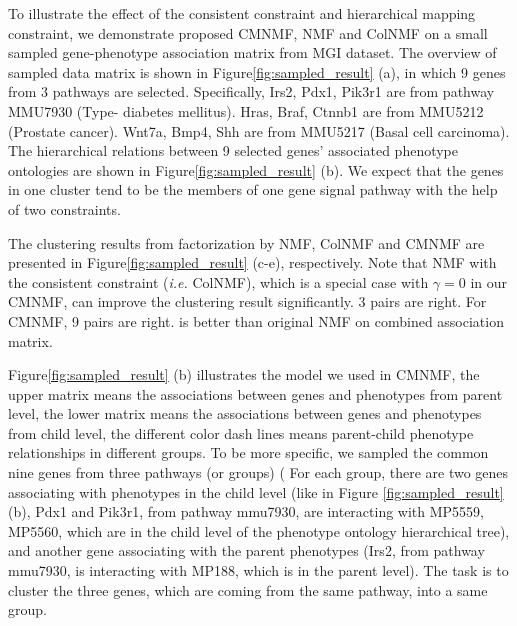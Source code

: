 \documentclass{bmcart}
\begin{document}
To illustrate the effect of the consistent constraint and hierarchical mapping constraint, we demonstrate proposed CMNMF, NMF and ColNMF on a small sampled gene-phenotype association matrix from MGI dataset. The overview of sampled data matrix is shown in Figure\ref{fig:sampled_result} (a), in which 9 genes from 3 pathways are selected. Specifically, Irs2, Pdx1, Pik3r1 are from pathway MMU7930 (Type-\uppercase\expandafter{} diabetes mellitus). Hras, Braf, Ctnnb1 are from MMU5212 (Prostate cancer). Wnt7a, Bmp4, Shh are from MMU5217 (Basal cell carcinoma). The hierarchical relations between 9 selected genes' associated phenotype ontologies are shown in Figure\ref{fig:sampled_result} (b). We expect that the genes in one cluster tend to be the members of one gene signal pathway with the help of two constraints.

The clustering results from factorization by NMF, ColNMF and CMNMF are presented in Figure\ref{fig:sampled_result} (c-e), respectively. Note that NMF with the consistent constraint (\emph{i.e.} ColNMF), which is a special case with $\gamma=0$ in our CMNMF, can improve the clustering result significantly. 3 pairs are right. For CMNMF, 9 pairs are right. is better than original NMF on combined association matrix.


Figure\ref{fig:sampled_result} (b) illustrates the model we used in CMNMF, the upper matrix means the associations between genes and phenotypes from parent level, the lower matrix means the associations between genes and phenotypes from child level, the different color dash lines means parent-child phenotype relationships in different groups.
To be more specific, we sampled the common nine genes from three pathways (or groups) ( For each group, there are two genes associating with phenotypes in the child level (like in Figure \ref{fig:sampled_result}(b), Pdx1 and Pik3r1, from pathway mmu7930, are interacting with MP5559, MP5560, which are in the child level of the phenotype ontology hierarchical tree), and another gene associating with the parent phenotypes (Irs2, from pathway mmu7930, is interacting with MP188, which is in the parent level). The task is to cluster the three genes, which are coming from the same pathway, into a same group.
\end{document}
